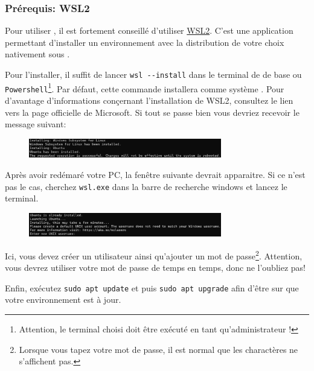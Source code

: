     \subsubsection[Prérequis][fr.wikipedia.org/wiki/Windows_Subsystem_for_Linux]{Prérequis: WSL2}

    Pour utiliser \dockerdesktop, il est fortement conseillé d'utiliser \href{https://learn.microsoft.com/fr-fr/windows/wsl/install}{WSL2}. C'est une application \windows{} permettant d'installer un environnement \linux{} avec la distribution de votre choix nativement sous \windows{}. 

    Pour l'installer, il suffit de lancer \verb|wsl --install| dans le terminal de \windows{} de base ou \texttt{Powershell}\footnote{Attention, le terminal choisi doit être exécuté en tant qu'administrateur !}. Par défaut, cette commande installera \ubuntu{} comme système \linux. Pour d'avantage d'informations conçernant l'installation de WSL2, consultez le lien vers la page officielle de Microsoft. Si tout se passe bien vous devriez recevoir le message suivant:

    \begin{figure}[!th]
        \centering
        \includegraphics[width=0.75\textwidth]{Images_formation/ubuntu_installation.pdf}
    \end{figure}

    Après avoir redémaré votre PC, la fenêtre suivante devrait apparaitre. Si ce n'est pas le cas, cherchez \texttt{wsl.exe} dans la barre de recherche windows et lancez le terminal.

    \begin{figure}[!th]
        \centering
        \includegraphics[width=0.75\textwidth]{Images_formation/user_creation.pdf}
    \end{figure}

    Ici, vous devez créer un utilisateur ainsi qu'ajouter un mot de passe\footnote{Lorsque vous tapez votre mot de passe, il est normal que les charactères ne s'affichent pas.}. Attention, vous devrez utiliser votre mot de passe de temps en temps, donc ne l'oubliez pas!

    Enfin, exécutez \verb|sudo apt update| et puis \verb|sudo apt upgrade| afin d'être sur que votre environnement est à jour.

